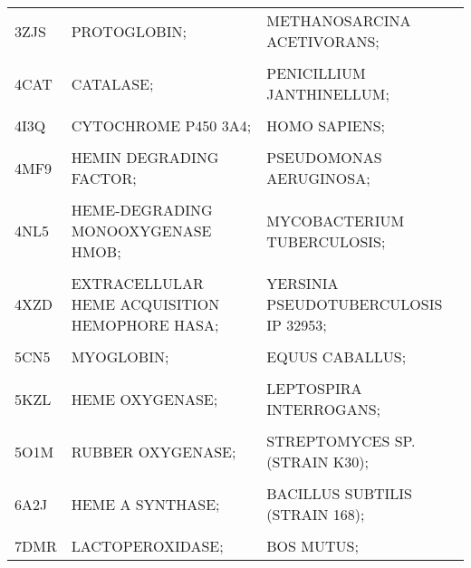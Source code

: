 \begin{table}
{\begin{tabular}{lll}
			3ZJS & PROTOGLOBIN; & METHANOSARCINA ACETIVORANS;\\
			\cellcolor{gray!6}{4B8N} & \cellcolor{gray!6}{CYTOCHROME B5-HOST ORIGIN;} & \cellcolor{gray!6}{OSTREOCOCCUS TAURI VIRUS 2;}\\
			4CAT & CATALASE; & PENICILLIUM JANTHINELLUM;\\
			\addlinespace
			\cellcolor{gray!6}{4CDP} & \cellcolor{gray!6}{PUTATIVE HEME/HEMOGLOBIN TRANSPORT PROTEIN;} & \cellcolor{gray!6}{ESCHERICHIA COLI;}\\
			4I3Q & CYTOCHROME P450 3A4; & HOMO SAPIENS;\\
			\cellcolor{gray!6}{4JET} & \cellcolor{gray!6}{HEMOPHORE HASA;} & \cellcolor{gray!6}{YERSINIA PESTIS;}\\
			4MF9 & HEMIN DEGRADING FACTOR; & PSEUDOMONAS AERUGINOSA;\\
			\cellcolor{gray!6}{4MYP} & \cellcolor{gray!6}{IRON-REGULATED SURFACE DETERMINANT PROTEIN A;} & \cellcolor{gray!6}{LISTERIA MONOCYTOGENES;}\\
			\addlinespace
			4NL5 & HEME-DEGRADING MONOOXYGENASE HMOB; & MYCOBACTERIUM TUBERCULOSIS;\\
			\cellcolor{gray!6}{4UZV} & \cellcolor{gray!6}{HEMOGLOBIN;} & \cellcolor{gray!6}{THERMOBIFIDA FUSCA TM51;}\\
			4XZD & EXTRACELLULAR HEME ACQUISITION HEMOPHORE HASA; & YERSINIA PSEUDOTUBERCULOSIS IP 32953;\\
			\cellcolor{gray!6}{4Y1Q} & \cellcolor{gray!6}{EXTRACELLULAR HEME ACQUISITION HEMOPHORE HASA;} & \cellcolor{gray!6}{YERSINIA PSEUDOTUBERCULOSIS IP 32953;}\\
			5CN5 & MYOGLOBIN; & EQUUS CABALLUS;\\
			\addlinespace
			\cellcolor{gray!6}{5GJ3} & \cellcolor{gray!6}{PERIPLASMIC BINDING PROTEIN;} & \cellcolor{gray!6}{ROSEIFLEXUS SP. RS-1;}\\
			5KZL & HEME OXYGENASE; & LEPTOSPIRA INTERROGANS;\\
			\cellcolor{gray!6}{5O1L} & \cellcolor{gray!6}{RUBBER OXYGENASE;} & \cellcolor{gray!6}{STREPTOMYCES SP. (STRAIN K30);}\\
			5O1M & RUBBER OXYGENASE; & STREPTOMYCES SP. (STRAIN K30);\\
			\cellcolor{gray!6}{5VEU} & \cellcolor{gray!6}{CYTOCHROME P450 3A5;} & \cellcolor{gray!6}{HOMO SAPIENS;}\\
			\addlinespace
			6A2J & HEME A SYNTHASE; & BACILLUS SUBTILIS (STRAIN 168);\\
			\cellcolor{gray!6}{7C74} & \cellcolor{gray!6}{LACTOPEROXIDASE;} & \cellcolor{gray!6}{BOS MUTUS;}\\
			7DMR & LACTOPEROXIDASE; & BOS MUTUS;\\
			\bottomrule
	\end{tabular}}
\end{table}


